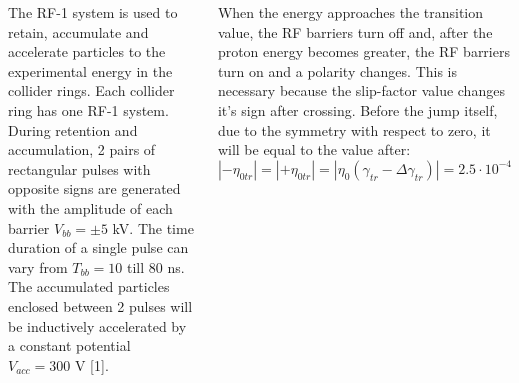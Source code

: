 \documentclass[25pt, a0paper, portrait, blockverticalspace=.5cm]{tikzposter}
\begin{document}
\begin{columns}
{\begin{minipage}{0.465\linewidth}
\begin{tikzpicture}
			\end{tikzpicture}
		\end{minipage}
		\begin{minipage}{0.495\linewidth}
		\end{minipage}
		
\par The RF-1 system is used to retain, accumulate and accelerate particles to the experimental energy in the collider rings. Each collider ring has one RF-1 system. During retention and accumulation, 2 pairs of rectangular pulses with opposite signs are generated with the amplitude of each barrier $V_{bb}=\pm5$ kV. The time duration of a single pulse can vary from $T_{bb}=10$ till $80$ ns. The accumulated particles enclosed between 2 pulses will be inductively accelerated by a constant potential $V_{acc}=300$ V [1]. \\

\par When the energy approaches the transition value, the RF barriers turn off and, after the proton energy becomes greater, the RF barriers turn on and a polarity changes. This is necessary because the slip-factor value changes it’s sign after crossing. Before the jump itself, due to the symmetry with respect to zero, it will be equal to the value after:
$$
\left|-\eta_{0 t r}\right|=\left|+\eta_{0 t r}\right|=\left|\eta_{0}\left(\gamma_{t r}-\Delta \gamma_{t r}\right)\right|=2.5 \cdot 10^{-4}
$$

}
\end{columns}
\end{document}
